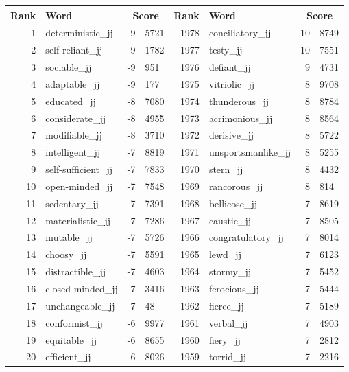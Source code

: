 \begin{table}[tbp]
    \begin{tabular}{| rlr@{.}l | rlr@{.}l |}
    \hline
    \textbf{Rank} & \textbf{Word} & \multicolumn{2}{c|}{\textbf{Score}} & \textbf{Rank} & \textbf{Word} & \multicolumn{2}{c|}{\textbf{Score}} \\
    \hline
    1 & deterministic\_jj & -9 & 5721    &    1978 & conciliatory\_jj & 10 & 8749 \\
    2 & self-reliant\_jj & -9 & 1782    &    1977 & testy\_jj & 10 & 7551 \\
    3 & sociable\_jj & -9 & 951    &    1976 & defiant\_jj & 9 & 4731 \\
    4 & adaptable\_jj & -9 & 177    &    1975 & vitriolic\_jj & 8 & 9708 \\
    5 & educated\_jj & -8 & 7080    &    1974 & thunderous\_jj & 8 & 8784 \\
    6 & considerate\_jj & -8 & 4955    &    1973 & acrimonious\_jj & 8 & 8564 \\
    7 & modifiable\_jj & -8 & 3710    &    1972 & derisive\_jj & 8 & 5722 \\
    8 & intelligent\_jj & -7 & 8819    &    1971 & unsportsmanlike\_jj & 8 & 5255 \\
    9 & self-sufficient\_jj & -7 & 7833    &    1970 & stern\_jj & 8 & 4432 \\
    10 & open-minded\_jj & -7 & 7548    &    1969 & rancorous\_jj & 8 & 814 \\
    11 & sedentary\_jj & -7 & 7391    &    1968 & bellicose\_jj & 7 & 8619 \\
    12 & materialistic\_jj & -7 & 7286    &    1967 & caustic\_jj & 7 & 8505 \\
    13 & mutable\_jj & -7 & 5726    &    1966 & congratulatory\_jj & 7 & 8014 \\
    14 & choosy\_jj & -7 & 5591    &    1965 & lewd\_jj & 7 & 6123 \\
    15 & distractible\_jj & -7 & 4603    &    1964 & stormy\_jj & 7 & 5452 \\
    16 & closed-minded\_jj & -7 & 3416    &    1963 & ferocious\_jj & 7 & 5444 \\
    17 & unchangeable\_jj & -7 & 48    &    1962 & fierce\_jj & 7 & 5189 \\
    18 & conformist\_jj & -6 & 9977    &    1961 & verbal\_jj & 7 & 4903 \\
    19 & equitable\_jj & -6 & 8655    &    1960 & fiery\_jj & 7 & 2812 \\
    20 & efficient\_jj & -6 & 8026    &    1959 & torrid\_jj & 7 & 2216 \\

\end{tabular}
\end{table}
